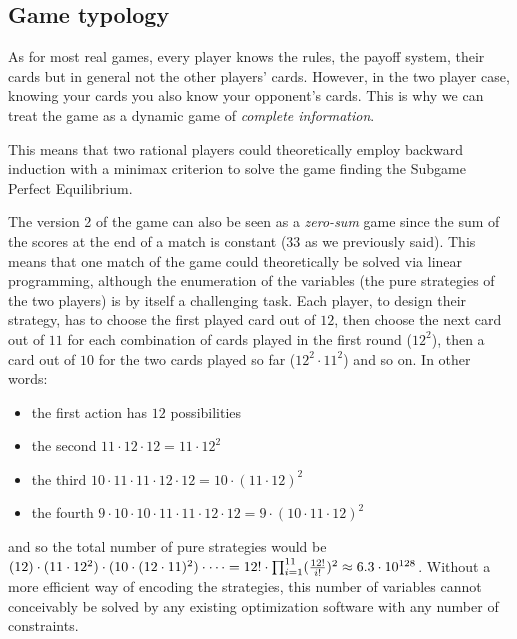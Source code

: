 \documentclass[conference]{IEEEtran}
\begin{document}
\subsection{Game typology}
As for most real games, every player knows the rules, the payoff system, their cards but in general not the other players' cards. However, in the two player case, knowing your cards you also know your opponent's cards. This is why we can treat the game as a dynamic game of \textit{complete information}. 

This means that two rational players could theoretically employ backward induction with a minimax criterion to solve the game finding the Subgame Perfect Equilibrium. 

The version 2 of the game can also be seen as a \textit{zero-sum} game since the sum of the scores at the end of a match is constant ($33$ as we previously said). This means that one match of the game could theoretically be solved via linear programming, although the enumeration of the variables (the pure strategies of the two players) is by itself a challenging task. Each player, to design their strategy, has to choose the first played card out of $12$, then choose the next card out of $11$ for each combination of cards played in the first round ($12^2$), then a card out of $10$ for the two cards played so far ($12^2 \cdot 11^2$) and so on. In other words:
\begin{itemize}
    \item the first action has $12$ possibilities
    \item the second $11\cdot 12\cdot 12=11\cdot 12^2$
    \item the third $10\cdot 11\cdot 11\cdot 12\cdot 12=10\cdot (11\cdot 12)^2$
    \item the fourth $9\cdot 10\cdot 10\cdot 11\cdot 11\cdot 12\cdot 12=9\cdot (10\cdot 11\cdot 12)^2$
\end{itemize}
and so the total number of pure strategies would be $(12) \cdot (11 \cdot 12^2) \cdot (10 \cdot (12 \cdot 11)^2) \cdot \dots = 12! \cdot \prod_{i=1}^{11}({12! \over i!})^2 \approx 6.3 \cdot 10^{128}$. Without a more efficient way of encoding the strategies, this number of variables cannot conceivably be solved by any existing optimization software with any number of constraints.
\end{document}
